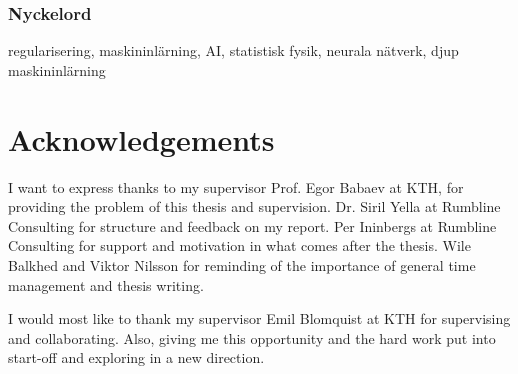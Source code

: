 \subsection*{Nyckelord}
regularisering, maskininlärning, AI, statistisk fysik, neurala nätverk, djup maskininlärning


\newpage
\thispagestyle{plain}
\chapter*{Acknowledgements}
I want to express thanks to my supervisor Prof. Egor Babaev at KTH, for providing the problem of this thesis and supervision. Dr. Siril Yella at Rumbline Consulting for structure and feedback on my report. Per Ininbergs at Rumbline Consulting for support and motivation in what comes after the thesis. Wile Balkhed and Viktor Nilsson for reminding of the importance of general time management and thesis writing. 

I would most like to thank my supervisor Emil Blomquist at KTH for supervising and collaborating. Also, giving me this opportunity and the hard work put into start-off and exploring in a new direction.

\newpage

\thispagestyle{plain}

\tableofcontents

\newpage
{}

